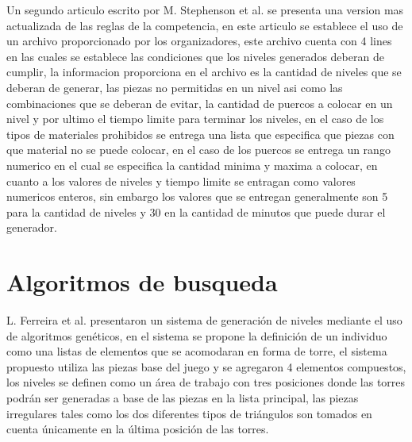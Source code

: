 Un segundo articulo escrito por M. Stephenson et al.\cite{Stephenson2018} se
presenta una version mas actualizada de las reglas de la competencia, en este
articulo se establece el uso de un archivo proporcionado por los organizadores,
este archivo cuenta con 4 lines en las cuales se establece las condiciones que
los niveles generados deberan de cumplir, la informacion proporciona en el
archivo es la cantidad de niveles que se deberan de generar, las piezas no
permitidas en un nivel asi como las combinaciones que se deberan de evitar, la
cantidad de puercos a colocar en un nivel y por ultimo el tiempo limite para
terminar los niveles, en el caso de los tipos de materiales prohibidos se
entrega una lista que especifica que piezas con que material no se puede
colocar, en el caso de los puercos se entrega un rango numerico en el cual se
especifica la cantidad minima y maxima a colocar, en cuanto a los valores de
niveles y tiempo limite se entragan como valores numericos enteros, sin embargo
los valores que se entregan generalmente son 5 para la cantidad de niveles y 30
en la cantidad de minutos que puede durar el generador.

\section{Algoritmos de busqueda}
\label{section:search-based}

L. Ferreira et al.\cite{Ferreira2014} presentaron un sistema de generación de
niveles mediante el uso de algoritmos genéticos, en el sistema se propone la
definición de un individuo como una listas de elementos que se acomodaran en
forma de torre, el sistema propuesto utiliza las piezas base del juego y se
agregaron 4 elementos compuestos, los niveles se definen como un área de trabajo
con tres posiciones donde las torres podrán ser generadas a base de las piezas
en la lista principal, las piezas irregulares tales como los dos diferentes
tipos de triángulos son tomados en cuenta únicamente en la última posición de
las torres.


